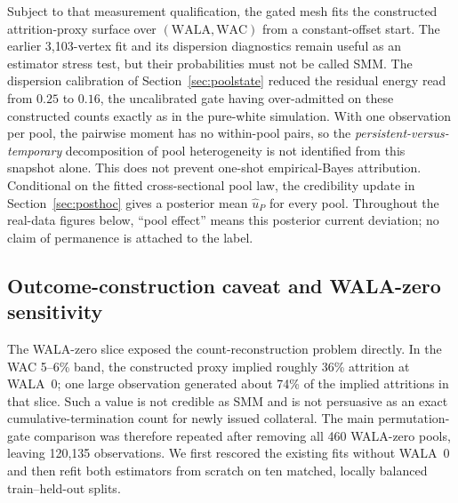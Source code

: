 \documentclass[11pt]{article}
\begin{document}
Subject to that measurement qualification, the gated mesh fits the constructed
attrition-proxy surface over $(\text{WALA},\text{WAC})$ from a constant-offset
start. The earlier 3{,}103-vertex fit and its dispersion diagnostics remain
useful as an estimator stress test, but their probabilities must not be called
SMM. The dispersion calibration of Section~\ref{sec:poolstate} reduced the
residual energy read from $0.25$ to $0.16$, the uncalibrated gate having
over-admitted on these constructed counts exactly as in the pure-white
simulation.
With one observation per pool, the pairwise moment has no within-pool pairs, so the
\emph{persistent-versus-temporary} decomposition of pool heterogeneity is not identified from this
snapshot alone. This does not prevent one-shot empirical-Bayes attribution. Conditional on the fitted
cross-sectional pool law, the credibility update in Section~\ref{sec:posthoc} gives a posterior mean
$\hat u_P$ for every pool. Throughout the real-data figures below, ``pool effect'' means this posterior
current deviation; no claim of permanence is attached to the label.


\subsection{Outcome-construction caveat and WALA-zero sensitivity}\label{sec:wala0-audit}

The WALA-zero slice exposed the count-reconstruction problem directly. In the
WAC 5--6\% band, the constructed proxy implied roughly 36\% attrition at
WALA~0; one large observation generated about 74\% of the implied attritions
in that slice. Such a value is not credible as SMM and is not persuasive as an
exact cumulative-termination count for newly issued collateral. The main
permutation-gate comparison was therefore repeated after removing all 460
WALA-zero pools, leaving 120{,}135 observations. We first rescored the existing
fits without WALA~0 and then refit both estimators from scratch on ten matched,
locally balanced train--held-out splits.

\begin{table}[H]
\centering
\small
\caption{Real Ginnie proxy fit after removing WALA~0 and refitting. Values are
means across ten matched splits. Lower held-out deviance and $X^2$/information
are better.}
\label{tab:no-wala0-real}
\end{table}
\end{document}
